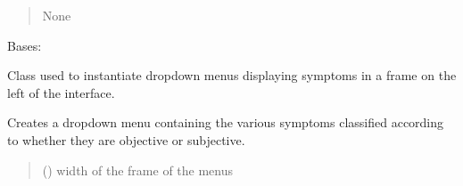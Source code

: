 \documentclass[letterpaper,10pt,english]{sphinxmanual}
\begin{document}
\begin{fulllineitems}
\begin{fulllineitems}
\begin{quote}
\begin{description}
\sphinxAtStartPar
None

\sphinxAtStartPar
{} \textendash{} 

\end{description}\end{quote}

\end{fulllineitems}


\end{fulllineitems}


\begin{fulllineitems}
\label{\detokenize{general_interface:general_interface.Menu_symptomes}}
\pysigstartsignatures
{}
\pysigstopsignatures
\sphinxAtStartPar
Bases: 

\sphinxAtStartPar
Class used to instantiate drop\sphinxhyphen{}down menus displaying symptoms in a frame on the left of the interface.

\begin{fulllineitems}
\label{\detokenize{general_interface:general_interface.Menu_symptomes.create_dropdown_menus}}
\pysigstartsignatures
{}
\pysigstopsignatures
\sphinxAtStartPar
Creates a drop\sphinxhyphen{}down menu containing the various symptoms classified according to whether they are objective or subjective.
\begin{quote}\begin{description}
\sphinxAtStartPar
{} () \textendash{} width of the frame of the menus


\end{description}
\end{quote}
\end{fulllineitems}
\end{fulllineitems}
\end{document}
